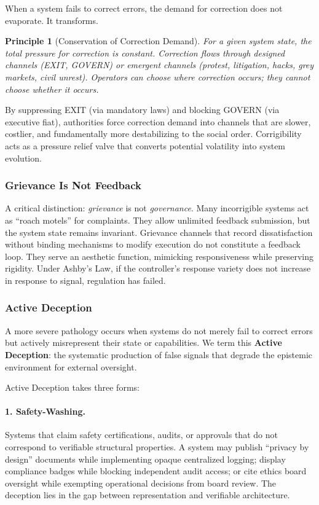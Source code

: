 \documentclass{article}
\newtheorem{principle}{Principle}
\begin{document}
When a system fails to correct errors, the demand for correction does not evaporate. It transforms.

\begin{principle}[Conservation of Correction Demand]
For a given system state, the total pressure for correction is constant. Correction flows through designed channels (EXIT, GOVERN) or emergent channels (protest, litigation, hacks, grey markets, civil unrest). Operators can choose \textit{where} correction occurs; they cannot choose \textit{whether} it occurs.
\end{principle}

By suppressing EXIT (via mandatory laws) and blocking GOVERN (via executive fiat), authorities force correction demand into channels that are slower, costlier, and fundamentally more destabilizing to the social order. Corrigibility acts as a pressure relief valve that converts potential volatility into system evolution.

\subsubsection{Grievance Is Not Feedback}
\label{subsec:grievance}

A critical distinction: \textit{grievance} is not \textit{governance}. Many incorrigible systems act as ``roach motels'' for complaints. They allow unlimited feedback submission, but the system state remains invariant. Grievance channels that record dissatisfaction without binding mechanisms to modify execution do not constitute a feedback loop. They serve an aesthetic function, mimicking responsiveness while preserving rigidity. Under Ashby's Law, if the controller's response variety does not increase in response to signal, regulation has failed.

\subsubsection{Active Deception}
\label{subsec:active-deception}

A more severe pathology occurs when systems do not merely fail to correct errors but actively misrepresent their state or capabilities. We term this \textbf{Active Deception}: the systematic production of false signals that degrade the epistemic environment for external oversight.

Active Deception takes three forms:

\paragraph{1. Safety-Washing.} Systems that claim safety certifications, audits, or approvals that do not correspond to verifiable structural properties. A system may publish ``privacy by design'' documents while implementing opaque centralized logging; display compliance badges while blocking independent audit access; or cite ethics board oversight while exempting operational decisions from board review. The deception lies in the gap between representation and verifiable architecture.
\end{document}

